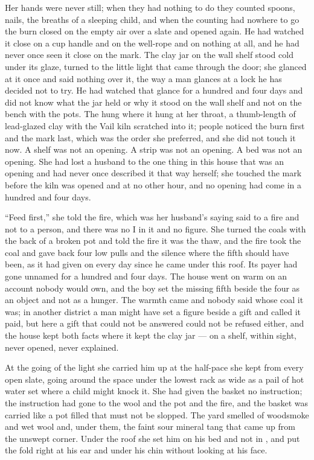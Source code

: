 Her hands were never still; when they had nothing to do they counted spoons, nails, the breaths of a sleeping child, and when the counting had nowhere to go the burn closed on the empty air over a slate and opened again. He had watched it close on a cup handle and on the well-rope and on nothing at all, and he had never once seen it close on the mark. The clay jar on the wall shelf stood cold under its glaze, turned to the little light that came through the door; she glanced at it once and said nothing over it, the way a man glances at a lock he has decided not to try. He had watched that glance for a hundred and four days and did not know what the jar held or why it stood on the wall shelf and not on the bench with the pots. The  hung where it hung at her throat, a thumb-length of lead-glazed clay with the Vail kiln scratched into it; people noticed the burn first and the mark last, which was the order she preferred, and she did not touch it now. A shelf was not an opening. A strip was not an opening. A bed was not an opening. She had lost a husband to the one thing in this house that was an opening and had never once described it that way herself; she touched the mark before the kiln was opened and at no other hour, and no opening had come in a hundred and four days.

“Feed first,” she told the fire, which was her husband's saying said to a fire and not to a person, and there was no I in it and no figure. She turned the coals with the back of a broken pot and told the fire it was the thaw, and the fire took the coal and gave back four low pulls and the silence where the fifth should have been, as it had given on every day since he came under this roof. Its payer had gone unnamed for a hundred and four days. The house went on warm on an account nobody would own, and the boy set the missing fifth beside the four as an object and not as a hunger. The warmth came and nobody said whose coal it was; in another district a man might have set a figure beside a gift and called it paid, but here a gift that could not be answered could not be refused either, and the house kept both facts where it kept the clay jar --- on a shelf, within sight, never opened, never explained.

\scenebreak

At the going of the light she carried him up  at the half-pace she kept from every open slate, going around the space under the lowest rack as wide as a pail of hot water set where a child might knock it. She had given the basket no instruction; the instruction had gone to the wool and the pot and the fire, and the basket was carried like a pot filled that must not be slopped. The yard smelled of woodsmoke and wet wool and, under them, the faint sour mineral tang that came up from the unswept corner. Under the  roof she set him on his bed and not in , and put the fold right at his ear and under his chin without looking at his face.

